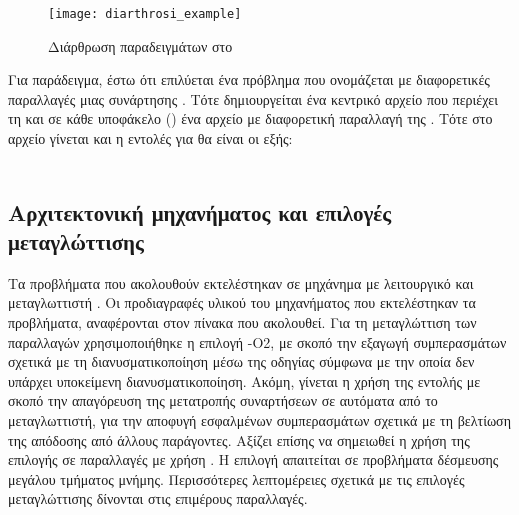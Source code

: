 \begin{center}
\begin{figure}[h]
\centering
\texttt{[image: diarthrosi\_example]}
\captionsetup{justification=centering, singlelinecheck=false}
\caption{Διάρθρωση παραδειγμάτων στο \href{https://github.com/gkonto/openmp/}{\emph{}}}
\label{fig:diarthrosi_example}
\end{figure}
\end{center}

Για παράδειγμα, έστω ότι επιλύεται ένα πρόβλημα που ονομάζεται \emph{} με διαφορετικές παραλλαγές μιας
συνάρτησης \emph{}. Τότε δημιουργείται ένα κεντρικό αρχείο \emph{} που περιέχει τη
\emph{} και σε κάθε υποφάκελο (\emph{}) ένα αρχείο \emph{} με διαφορετική παραλλαγή
της \emph{}. Τότε στο αρχείο  γίνεται \emph{} και η εντολές για
\emph{} θα είναι οι εξής:\\
\\
\clearpage
\subsection{Αρχιτεκτονική μηχανήματος και επιλογές μεταγλώττισης}
Τα προβλήματα που ακολουθούν εκτελέστηκαν σε μηχάνημα με λειτουργικό \emph{} και μεταγλωττιστή
\emph{}. Οι προδιαγραφές υλικού του μηχανήματος που εκτελέστηκαν τα προβλήματα, αναφέρονται στον πίνακα που ακολουθεί. Για τη μεταγλώττιση των παραλλαγών χρησιμοποιήθηκε η επιλογή -Ο2, με σκοπό την εξαγωγή συμπερασμάτων σχετικά με τη διανυσματικοποίηση μέσω της οδηγίας \emph{} σύμφωνα με την οποία δεν υπάρχει υποκείμενη διανυσματικοποίηση. Ακόμη, γίνεται η χρήση της εντολής  με σκοπό την απαγόρευση της μετατροπής συναρτήσεων σε  αυτόματα από το μεταγλωττιστή, για την αποφυγή εσφαλμένων συμπερασμάτων σχετικά με τη βελτίωση της απόδοσης από άλλους παράγοντες. Αξίζει επίσης να σημειωθεί η χρήση της επιλογής  σε παραλλαγές με χρήση . Η επιλογή απαιτείται σε προβλήματα δέσμευσης μεγάλου τμήματος  μνήμης. Περισσότερες λεπτομέρειες σχετικά με τις επιλογές μεταγλώττισης δίνονται στις επιμέρους παραλλαγές.

